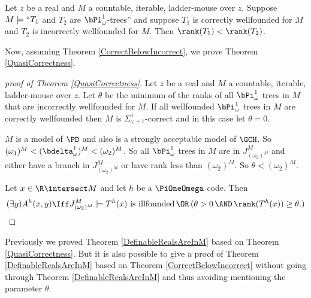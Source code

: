 \documentclass[oneside,12pt]{amsart}
\begin{document}
\begin{theorem}
\label{CorrectBelowIncorrect}
Let $z$ be a real and $M$ a countable, iterable, ladder-mouse over $z$.
Suppose $M\models ``T_1$ and $T_2$ are $\bPi^1_{\omega}$-trees'' and
suppose $T_1$ is correctly wellfounded for $M$ and
$T_2$ is incorrectly wellfounded for $M$. Then $\rank(T_1) < \rank(T_2)$.
\end{theorem}

Now, assuming Theorem \ref{CorrectBelowIncorrect}, we prove Theorem
\ref{QuasiCorrectness}.

\begin{proof}[proof of Theorem \ref{QuasiCorrectness}]
Let $z$ be a real and $M$ a countable, iterable, ladder-mouse over $z$.
Let $\theta$ be the minimum of the ranks of all
$\bPi^1_{\omega}$ trees in $M$ that are  incorrectly wellfounded for $M$.
If all wellfounded $\bPi^1_{\omega}$ trees in $M$ are correctly wellfounded
then $M$ is $\Sigma^1_{\omega+1}$-correct and in this case let $\theta=0$.

$M$ is a model of $\PD$ and also is a strongly acceptable model of $\GCH$.
So $(\omega_1)^M<(\bdelta^1_{\omega})^M < (\omega_2)^M$.
So all $\bPi^1_{\omega}$ trees in $M$ are in $J^M_{(\omega_2)^M}$ and either have a branch
in $J^M_{(\omega_2)^M}$ or have rank less than $(\omega_2)^M$.
So $\theta < (\omega_2)^M$.


Let $x\in\R\intersect M$ and let $h$ be a
$\PiOneOmega$ code. Then
$$(\exists y) A^h(x,y) \Iff J^M_{(\omega_2)^M}\models T^h(x) \text{ is illfounded} \,\OR\, (\theta>0 \,\AND\, \rank(T^h(x)) \geq \theta.)$$
\end{proof}

Previously we proved Theorem \ref{DefinableRealsAreInM} based on
Theorem \ref{QuasiCorrectness}. But it is also possible to give a proof
of Theorem \ref{DefinableRealsAreInM} based on Theorem \ref{CorrectBelowIncorrect}
without going through Theorem \ref{DefinableRealsAreInM} and thus avoiding
mentioning the parameter $\theta$.
\end{document}
